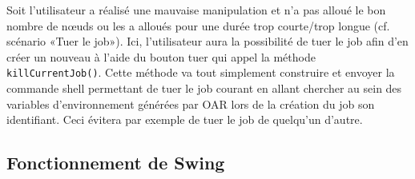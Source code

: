 \par Soit l’utilisateur a réalisé une mauvaise manipulation et n’a pas alloué le bon nombre de nœuds ou les a alloués pour une durée trop courte/trop longue (cf. scénario «Tuer le job»). Ici, l’utilisateur aura la possibilité de tuer le job afin d’en créer un nouveau à l’aide du bouton tuer qui appel la méthode \texttt{killCurrentJob()}. Cette méthode va tout simplement construire et envoyer la commande shell permettant de tuer le job courant en allant chercher au sein des variables d’environnement générées par OAR lors de la création du job son identifiant. Ceci évitera par exemple de tuer le job de quelqu’un d’autre.

\subsection{Fonctionnement de Swing}
\label{sec:fonct-de-swing}

